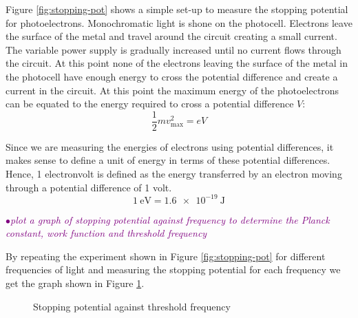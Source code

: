 \documentclass[a4paper,11pt,twoside]{memoir}
\newcounter{spec}[chapter]
\newcommand{\spec}[1]{\Needspace{5\baselineskip}\textcolor{purple}{$\bullet$\hspace{0.5cm}\textit{#1}}}
\begin{document}
Figure \ref{fig:stopping-pot} shows a simple set-up to measure the stopping potential for photoelectrons. Monochromatic light is shone on the photocell. Electrons leave the surface of the metal and travel around the circuit creating a small current. The variable power supply is gradually increased until no current flows through the circuit. At this point none of the electrons leaving the surface of the metal in the photocell have enough energy to cross the potential difference and create a current in the circuit. At this point the maximum energy of the photoelectrons can be equated to the energy required to cross a potential difference $V$:
\begin{equation}\label{eqn:photoelectron-stopping-pot}
  \frac{1}{2}mv_{\text{max}}^2 = eV
\end{equation}

Since we are measuring the energies of electrons using potential differences, it makes sense to define a unit of energy in terms of these potential differences. Hence, 1 electronvolt is defined as the energy transferred by an electron moving through a potential difference of 1 volt.
\begin{equation}
  \SI{1}{\electronvolt} = \SI{1.6e-19}{\joule}
\end{equation}

\spec{plot a graph of stopping potential against frequency to determine the Planck constant, work function and threshold frequency}

By repeating the experiment shown in Figure \ref{fig:stopping-pot} for different frequencies of light and measuring the stopping potential for each frequency we get the graph shown in Figure \ref{fig:milikan-results}.

\begin{figure}[ht]
  \begin{center}
  \end{center}
  \caption{Stopping potential against threshold frequency}
  \label{fig:milikan-results}
\end{figure}
\end{document}
